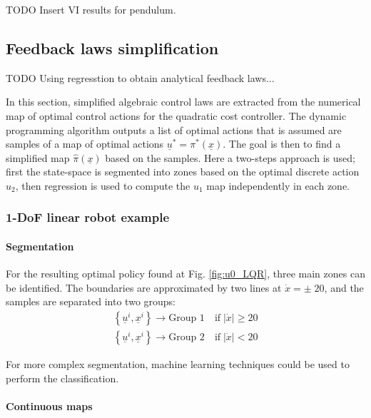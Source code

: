 TODO Insert VI results for pendulum.

\subsection{Feedback laws simplification}

TODO Using regresstion to obtain analytical feedback laws...

In this section, simplified algebraic control laws are extracted from the numerical map of optimal control actions for the quadratic cost controller. The dynamic programming algorithm outputs a list of optimal actions that is assumed are samples of a  map of optimal actions $\underline{u}^* = \pi^* ( \underline{x} )$. The goal is then to find a simplified map $\hat{\pi}( \underline{x} )$ based on the samples. Here a two-steps approach is used; first the state-space is segmented into zones based on the optimal discrete action $u_2$, then regression is used to compute the $u_1$ map independently in each zone. 

\subsubsection{1-DoF linear robot example}

\paragraph{Segmentation}
For the resulting optimal policy found at Fig. \ref{fig:u0_LQR}, three main zones can be identified. The boundaries are approximated by two lines at $\dot{x}= \pm \; 20 $, and the samples are separated into two groups:
\begin{align}
\left \{ \underline{u}^i , \underline{x}^i \right \} \rightarrow \text{Group 1} \quad \text{if} \; | \dot{x} | \geq 20 \\
\left \{ \underline{u}^i , \underline{x}^i \right \} \rightarrow \text{Group 2} \quad \text{if} \; | \dot{x} | < 20
\end{align}

For more complex segmentation, machine learning techniques could be used to perform the classification.

\paragraph{Continuous maps}

